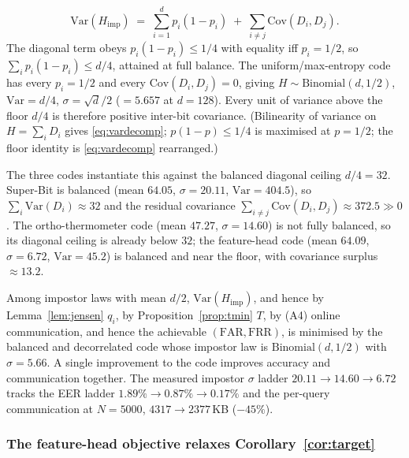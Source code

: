 \begin{theorem}
\label{thm:variance}
\begin{equation}
\label{eq:vardecomp}
\mathrm{Var}(H_{\mathrm{imp}}) \;=\; \sum_{i=1}^{d} p_i(1-p_i) \;+\; \sum_{i \neq j}
\mathrm{Cov}(D_i,D_j).
\end{equation}
The diagonal term obeys $p_i(1-p_i)\le 1/4$ with equality iff $p_i=1/2$, so $\sum_i p_i(1-p_i)\le d/4$,
attained at full balance. The uniform/max-entropy code has every $p_i=1/2$ and every
$\mathrm{Cov}(D_i,D_j)=0$, giving $H \sim \mathrm{Binomial}(d,1/2)$, $\mathrm{Var}=d/4$,
$\sigma=\sqrt{d}/2$ ($=5.657$ at $d=128$). Every unit of variance above the floor $d/4$ is therefore
positive inter-bit covariance. (Bilinearity of variance on $H=\sum_i D_i$ gives \eqref{eq:vardecomp};
$p(1-p)\le1/4$ is maximised at $p=1/2$; the floor identity is \eqref{eq:vardecomp} rearranged.)
\end{theorem}

The three codes instantiate this against the balanced diagonal ceiling $d/4=32$. Super-Bit is balanced
(mean $64.05$, $\sigma=20.11$, $\mathrm{Var}=404.5$), so $\sum_i \mathrm{Var}(D_i) \approx 32$ and the
residual covariance $\sum_{i\neq j}\mathrm{Cov}(D_i,D_j) \approx 372.5 \gg 0$. The ortho-thermometer
code (mean $47.27$, $\sigma=14.60$) is not fully balanced, so its diagonal ceiling is already below
$32$; the feature-head code (mean $64.09$, $\sigma=6.72$, $\mathrm{Var}=45.2$) is balanced and near the
floor, with covariance surplus $\approx 13.2$.

\begin{corollary}
\label{cor:target}
Among impostor laws with mean $d/2$, $\mathrm{Var}(H_{\mathrm{imp}})$, and hence by
Lemma~\ref{lem:jensen} $q_i$, by Proposition~\ref{prop:tmin} $T$, by (A4) online communication, and
hence the achievable $(\mathrm{FAR},\mathrm{FRR})$, is minimised by the balanced and decorrelated code
whose impostor law is $\mathrm{Binomial}(d,1/2)$ with $\sigma = 5.66$. A single improvement to the code
improves accuracy and communication together. The measured impostor $\sigma$ ladder
$20.11 \to 14.60 \to 6.72$ tracks the EER ladder $1.89\% \to 0.87\% \to 0.17\%$ and the per-query
communication at $N=5000$, $4317 \to 2377$\,KB ($-45\%$).
\end{corollary}

\subsubsection{The feature-head objective relaxes Corollary~\ref{cor:target}}


